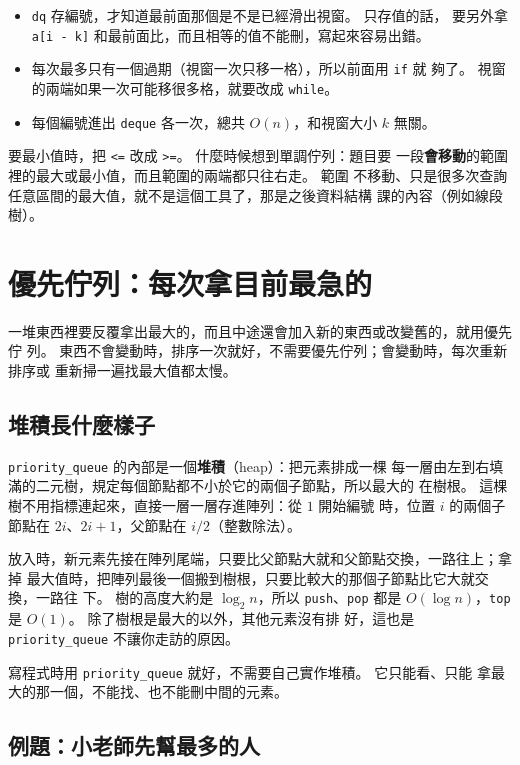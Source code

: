 \begin{itemize}
\item \texttt{dq} 存編號，才知道最前面那個是不是已經滑出視窗。 只存值的話，
要另外拿 \texttt{a[i - k]} 和最前面比，而且相等的值不能刪，寫起來容易出錯。
\item 每次最多只有一個過期（視窗一次只移一格），所以前面用 \texttt{if} 就
夠了。 視窗的兩端如果一次可能移很多格，就要改成 \texttt{while}。
\item 每個編號進出 \texttt{deque} 各一次，總共 $O(n)$，和視窗大小 $k$ 無關。
\end{itemize}

要最小值時，把 \texttt{<=} 改成 \texttt{>=}。 什麼時候想到單調佇列：題目要
一段\textbf{會移動}的範圍裡的最大或最小值，而且範圍的兩端都只往右走。 範圍
不移動、只是很多次查詢任意區間的最大值，就不是這個工具了，那是之後資料結構
課的內容（例如線段樹）。

\section{優先佇列：每次拿目前最急的}
\label{sec:pq}

一堆東西裡要反覆拿出最大的，而且中途還會加入新的東西或改變舊的，就用優先佇
列。 東西不會變動時，排序一次就好，不需要優先佇列；會變動時，每次重新排序或
重新掃一遍找最大值都太慢。

\subsection{堆積長什麼樣子}

\texttt{priority\_queue} 的內部是一個\textbf{堆積}（heap）：把元素排成一棵
每一層由左到右填滿的二元樹，規定每個節點都不小於它的兩個子節點，所以最大的
在樹根。 這棵樹不用指標連起來，直接一層一層存進陣列：從 $1$ 開始編號
時，位置 $i$ 的兩個子節點在 $2i$、$2i+1$，父節點在 $i/2$（整數除法）。

放入時，新元素先接在陣列尾端，只要比父節點大就和父節點交換，一路往上；拿掉
最大值時，把陣列最後一個搬到樹根，只要比較大的那個子節點比它大就交換，一路往
下。 樹的高度大約是 $\log_2 n$，所以 \texttt{push}、\texttt{pop} 都是
$O(\log n)$，\texttt{top} 是 $O(1)$。 除了樹根是最大的以外，其他元素沒有排
好，這也是 \texttt{priority\_queue} 不讓你走訪的原因。

寫程式時用 \texttt{priority\_queue} 就好，不需要自己實作堆積。 它只能看、只能
拿最大的那一個，不能找、也不能刪中間的元素。

\subsection{例題：小老師先幫最多的人}
\label{sec:ex-tutor}

